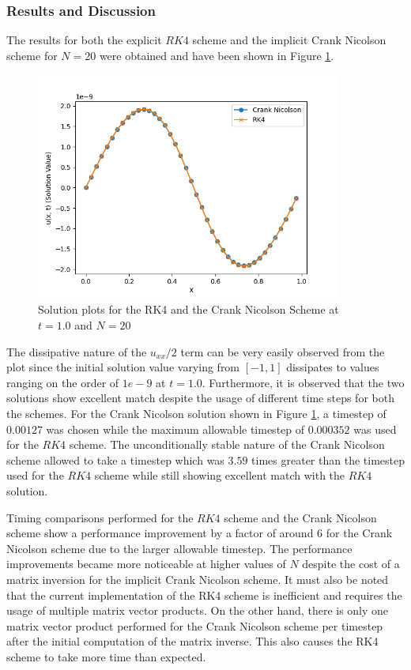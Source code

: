 \documentclass[12pt,dvipsnames]{article}
\newcommand{\an}[1]{{\leavevmode\color{BrickRed}{#1}}}
\begin{document}
\subsubsection{Results and Discussion}
The results for both the explicit $RK4$ scheme and the implicit Crank Nicolson scheme for $N = 20$ were obtained and have been shown in Figure \ref{fig:q1solutioncomp}.
\begin{figure}
    \centering
    \includegraphics[width=10cm]{Q1SolutionComparisont=0.001.png}
    \caption{Solution plots for the RK4 and the Crank Nicolson Scheme at $t = 1.0$ and $N = 20$ \an{Since the solution values are so small, it's clear that I unfortunately chose the viscosity too large :(}}
    \label{fig:q1solutioncomp}
\end{figure}
The dissipative nature of the $u_{xx}/2$ term can be very easily observed from the plot since the initial solution value varying from $[-1, 1]$ dissipates to values ranging on the order of $1e-9$ at $t=1.0$. Furthermore, it is observed that the two solutions show excellent match despite the usage of different time steps for both the schemes. For the Crank Nicolson solution shown in Figure \ref{fig:q1solutioncomp}, a timestep of $0.00127$ was chosen while the maximum allowable timestep of $0.000352$ was used for the $RK4$ scheme. The unconditionally stable nature of the Crank Nicolson scheme allowed to take a timestep which was $3.59$ times greater than the timestep used for the $RK4$ scheme while still showing excellent match with the $RK4$ solution. 

Timing comparisons performed for the $RK4$ scheme and the Crank Nicolson scheme show a performance improvement by a factor of around $6$ for the Crank Nicolson scheme due to the larger allowable timestep. The performance improvements became more noticeable at higher values of $N$ despite the cost of a matrix inversion for the implicit Crank Nicolson scheme. It must also be noted that the current implementation of the RK4 scheme is inefficient and requires the usage of multiple matrix vector products. On the other hand, there is only one matrix vector product performed for the Crank Nicolson scheme per timestep after the initial computation of the matrix inverse. This also causes the RK4 scheme to take more time than expected. \an{I wouldn't call your RK4 implementation that inefficient. You generally can't circumvent the required number of matvec operations.}
\end{document}
